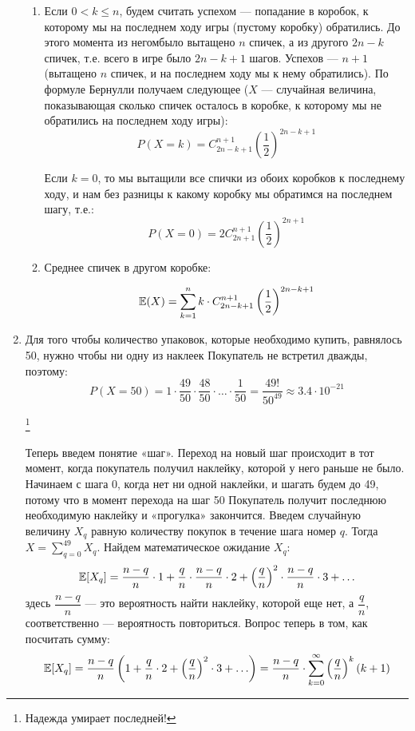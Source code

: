 \documentclass[12pt, a4paper]{article}\usepackage[]{graphicx}\usepackage[]{color}
\begin{document}
\begin{enumerate}
\begin{enumerate}
\item Если $0<k \leqslant n$, будем считать успехом — попадание в коробок, к которому мы на последнем ходу игры (пустому коробку) обратились. До этого момента из негомбыло вытащено $n$ спичек, а из другого $2n-k$ спичек, т.е. всего в игре было $2n - k + 1$ шагов. Успехов — $n + 1$ (вытащено $n$ спичек, и на последнем ходу мы к нему обратились). По формуле Бернулли получаем следующее ($X$ — случайная величина, показывающая сколько спичек осталось в коробке, к которому мы не обратились на последнем ходу игры):
$$P(X = k) = C^{n+1}_{2n-k+1} \left(\dfrac{1}{2} \right)^{2n-k+1}$$

Если $k = 0$, то мы вытащили все спички из обоих коробков к последнему ходу, и нам без разницы к какому коробку мы обратимся на последнем шагу, т.е.:
$$P(X = 0) =2 C^{n+1}_{2n+1} \left(\dfrac{1}{2} \right)^{2n+1}$$

\item Среднее спичек в другом коробке:

$$\mathbb{E}(X) = \sum \limits_{k=1}^{n} k \cdot C^{n+1}_{2n-k+1} \left(\dfrac{1}{2} \right)^{2n-k+1}$$


\end{enumerate}


\item
Для того чтобы количество упаковок, которые необходимо купить, равнялось 50, нужно чтобы ни одну из наклеек Покупатель не встретил дважды, поэтому:
$$
P(X=50) = 1\cdot\frac{49}{50}\cdot\frac{48}{50}\cdot\dots\cdot\frac{1}{50} = \frac{49!}{50^{49}} \approx 3.4\cdot
10^{-21}$$ \vspace{-1cm}

\hspace{10.5cm}\footnote[2]{Надежда умирает последней!}

Теперь введем понятие «шаг». Переход на новый шаг происходит в тот момент, когда покупатель получил наклейку, которой у него раньше не было. Начинаем с шага 0, когда нет ни одной наклейки, и шагать будем до 49, потому что в момент перехода на шаг 50 Покупатель получит последнюю необходимую наклейку и «прогулка» закончится. Введем случайную величину $X_q$ равную количеству покупок в течение шага номер $q$. Тогда $X = \sum \limits_{q=0}^{49}X_q$.  Найдем математическое ожидание $X_q$:
$$
\mathbb{E}[X_q] = \frac{n-q}{n}\cdot 1 + \frac{q}{n}\cdot\frac{n-q}{n}\cdot 2 + \left(\frac{q}{n}\right)^2\cdot\frac{n-q}{n}\cdot 3 + \ldots
$$
здесь $\dfrac{n-q}{n}$ —  это вероятность найти наклейку, которой еще нет, а $\dfrac{q}{n}$, соответственно — вероятность повториться. Вопрос теперь в том, как посчитать сумму:
$$
\mathbb{E}[X_q] = \frac{n-q}{n}\left( 1 + \frac{q}{n}\cdot 2 + \left(\frac{q}{n}\right)^2 \cdot 3 + \ldots\right) = \frac{n-q}{n}\cdot\sum\limits_{k=0}^{\infty}\left(\frac{q}{n}\right)^k(k+1)
$$


\end{enumerate}
\end{document}
